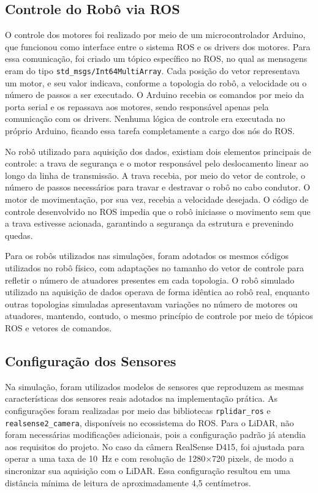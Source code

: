 \subsection{Controle do Robô via ROS}

O controle dos motores foi realizado por meio de um microcontrolador Arduino, que funcionou como interface entre o sistema ROS e os drivers dos motores. Para essa comunicação, foi criado um tópico específico no ROS, no qual as mensagens eram do tipo \texttt{std\_msgs/Int64MultiArray}. Cada posição do vetor representava um motor, e seu valor indicava, conforme a topologia do robô, a velocidade ou o número de passos a ser executado. O Arduino recebia os comandos por meio da porta serial e os repassava aos motores, sendo responsável apenas pela comunicação com os drivers. Nenhuma lógica de controle era executada no próprio Arduino, ficando essa tarefa completamente a cargo dos nós do ROS.

No robô utilizado para aquisição dos dados, existiam dois elementos principais de controle: a trava de segurança e o motor responsável pelo deslocamento linear ao longo da linha de transmissão. A trava recebia, por meio do vetor de controle, o número de passos necessários para travar e destravar o robô no cabo condutor. O motor de movimentação, por sua vez, recebia a velocidade desejada. O código de controle desenvolvido no ROS impedia que o robô iniciasse o movimento sem que a trava estivesse acionada, garantindo a segurança da estrutura e prevenindo quedas.

Para os robôs utilizados nas simulações, foram adotados os mesmos códigos utilizados no robô físico, com adaptações no tamanho do vetor de controle para refletir o número de atuadores presentes em cada topologia. O robô simulado utilizado na aquisição de dados operava de forma idêntica ao robô real, enquanto outras topologias simuladas apresentavam variações no número de motores ou atuadores, mantendo, contudo, o mesmo princípio de controle por meio de tópicos ROS e vetores de comandos.

\subsection{Configuração dos Sensores}

Na simulação, foram utilizados modelos de sensores que reproduzem as mesmas características dos sensores reais adotados na implementação prática. As configurações foram realizadas por meio das bibliotecas \texttt{rplidar\_ros} e \texttt{realsense2\_camera}, disponíveis no ecossistema do ROS. Para o LiDAR, não foram necessárias modificações adicionais, pois a configuração padrão já atendia aos requisitos do projeto. No caso da câmera RealSense D415, foi ajustada para operar a uma taxa de 10~Hz e com resolução de 1280$\times$720 pixels, de modo a sincronizar sua aquisição com o LiDAR. Essa configuração resultou em uma distância mínima de leitura de aproximadamente 4,5 centímetros.

